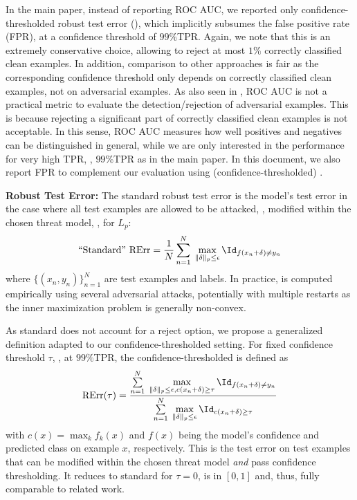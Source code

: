 In the main paper, instead of reporting ROC AUC, we reported only confidence-thresholded robust test error (\RTE), which implicitly subsumes the false positive rate (FPR), at a confidence threshold of $99\%$TPR. Again, we note that this is an extremely conservative choice, allowing to reject at most $1\%$ correctly classified clean examples. In addition, comparison to other approaches is fair as the corresponding confidence threshold only depends on correctly classified clean examples, not on adversarial examples. As also seen in , ROC AUC is not a practical metric to evaluate the detection/rejection of adversarial examples. This is because rejecting a significant part of correctly classified clean examples is not acceptable. In this sense, ROC AUC measures how well positives and negatives can be distinguished in general, while we are only interested in the performance for very high TPR, \eg, $99\%$TPR as in the main paper. In this document, we also report FPR to complement our evaluation using (confidence-thresholded) \RTE.

\textbf{Robust Test Error:} 
%
The standard robust test error \cite{MadryICLR2018} is the model's test error in the case where all test examples are allowed to be attacked, \ie, modified within the chosen threat model, \eg, for $L_p$:
\begin{align}
\text{``Standard'' }\RTE = \frac{1}{N}\sum_{n = 1}^N \;\max\limits_{\|\delta\|_p\leq \epsilon} \Id_{f(x_n + \delta)\neq y_n}\label{eq:supp-rte}
\end{align}
where $\{(x_n,y_n)\}_{n = 1}^N$ are test examples and labels. In practice, \RTE is computed empirically using several adversarial attacks, potentially with multiple restarts as the inner maximization problem is generally non-convex. 

As standard \RTE does not account for a reject option, we propose a generalized definition adapted to our confidence-thresholded setting. For fixed confidence threshold $\tau$, \eg, at $99\%$TPR, the confidence-thresholded \RTE is defined as
\begin{align}
\RTE(\tau) = \frac{
    \sum\limits_{n=1}^N \;\max\limits_{\|\delta\|_p\leq \epsilon, c(x_n + \delta)\geq \tau} \Id_{f(x_n + \delta)\neq y_n}
}
{
    \sum\limits_{n=1}^N \;\max\limits_{\|\delta\|_p\leq \epsilon} \Id_{c(x_n + \delta)\geq \tau}
}\label{eq:supp-conf-rte}
\end{align}
with $c(x) = \max_k f_k(x)$ and $f(x)$ being the model's confidence and predicted class on example $x$, respectively. This is the test error on test examples that can be modified within the chosen threat model \emph{and} pass confidence thresholding. It reduces to standard \RTE for $\tau = 0$, is in $[0,1]$ and, thus, fully comparable to related work.

